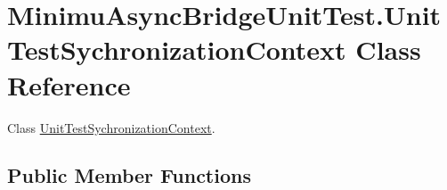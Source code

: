 \hypertarget{class_minimu_async_bridge_unit_test_1_1_unit_test_sychronization_context}{}\section{Minimu\+Async\+Bridge\+Unit\+Test.\+Unit\+Test\+Sychronization\+Context Class Reference}
\label{class_minimu_async_bridge_unit_test_1_1_unit_test_sychronization_context}


Class \hyperlink{class_minimu_async_bridge_unit_test_1_1_unit_test_sychronization_context}{Unit\+Test\+Sychronization\+Context}.  


\subsection*{Public Member Functions}
